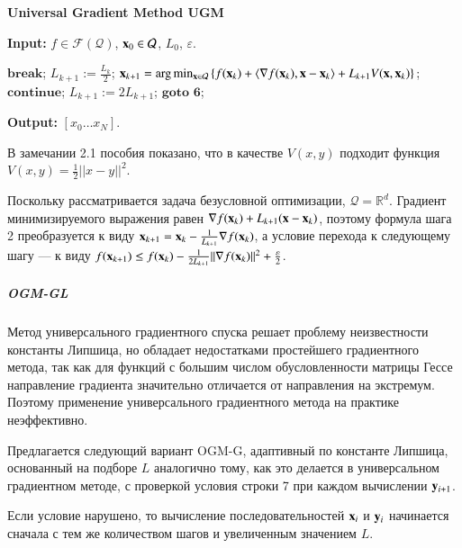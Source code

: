 \documentclass{crm-article}
\begin{document}
\begin{algorithm}
\caption{\bf{Universal Gradient Method UGM}}
\label{UGM}
\hspace*{\algorithmicindent} \textbf{Input: } $f\in \mathcal{F}(\mathcal{Q})$, ${\bf x}_0\in\mathcal{Q}$, $L_0$, $\varepsilon$.
\begin{algorithmic}[1]
\STATE $\textbf{break}$;
\ENDIF
\STATE $L_{k+1}:=\frac{L_k}{2}$;
\STATE ${\bf x}_{k+1} = \arg\min_{{\bf x}\in \mathcal{Q}} \left\{f({\bf x}_k) + \langle\nabla f({\bf x}_k), {\bf x}-{\bf x}_k\rangle + L_{k+1} V({\bf x}, {\bf x}_k) \right\}$;
\STATE $\textbf{continue}$;
\ELSE
\STATE $L_{k+1} := 2L_{k+1}$;
\STATE $\textbf{goto 6}$;
\ENDIF
\ENDFOR
\end{algorithmic}
\hspace*{\algorithmicindent} \textbf{Output: } $[x_0\ldots x_N]$.
\end{algorithm}

В замечании 2.1 пособия \cite{gasnikov2017universal} показано, что в качестве $V(x,y)$ подходит функция $V(x,y) = \frac{1}{2}||x-y||^2$.

Поскольку рассматривается задача безусловной оптимизации, $\mathcal{Q} = \mathbb{R}^d$. Градиент минимизируемого выражения равен $\nabla f({\bf x}_k) + L_{k+1}({\bf x} - {\bf x}_k)$, поэтому формула шага 2 преобразуется к виду ${\bf x}_{k+1} = {\bf x}_k - \frac{1}{L_{k+1}}\nabla f({\bf x}_k)$, а условие перехода к следующему шагу --- к виду $f({\bf x}_{k+1}) \leq f({\bf x}_k) - \frac{1}{2L_{k+1}}||\nabla f({\bf x}_k)||^2 + \frac{\varepsilon}{2}$.

\subparagraph{OGM-GL}

Метод универсального градиентного спуска решает проблему неизвестности константы Липшица, но обладает недостатками простейшего градиентного метода, так как для функций с большим числом обусловленности матрицы Гессе направление градиента значительно отличается от направления на экстремум. Поэтому применение универсального градиентного метода на практике неэффективно.

Предлагается следующий вариант OGM-G, адаптивный по константе Липшица, основанный на подборе $L$ аналогично тому, как это делается в универсальном градиентном методе, с проверкой условия строки 7 при каждом вычислении ${\bf y}_{i+1}$.

Если условие нарушено, то вычисление последовательностей ${\bf x}_i$ и ${\bf y}_i$ начинается сначала с тем же количеством шагов и увеличенным значением $L$.
\end{document}
